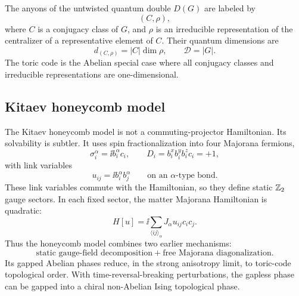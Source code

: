 The anyons of the untwisted quantum double \(D(G)\) are labeled by
\begin{equation}
\label{eq:conclusion-quantum-double-labels}
    (C,\rho),
\end{equation}
where \(C\) is a conjugacy class of \(G\), and \(\rho\) is an irreducible representation of the centralizer of a representative element of \(C\).  Their quantum dimensions are
\begin{equation}
\label{eq:conclusion-qdouble-dimensions}
    d_{(C,\rho)}=|C|\dim\rho,
    \qquad
    \mathcal{D}=|G|.
\end{equation}
The toric code is the Abelian special case where all conjugacy classes and irreducible representations are one-dimensional.

\subsection{Kitaev honeycomb model}

The Kitaev honeycomb model is not a commuting-projector Hamiltonian.  Its solvability is subtler.  It uses spin fractionalization into four Majorana fermions,
\begin{equation}
\label{eq:conclusion-khc-majorana-representation}
    \sigma_i^\alpha=\ii b_i^\alpha c_i,
    \qquad
    D_i=b_i^x b_i^y b_i^z c_i=+1,
\end{equation}
with link variables
\begin{equation}
\label{eq:conclusion-khc-link-variable}
    u_{ij}=\ii b_i^\alpha b_j^\alpha
    \qquad
    \text{on an }\alpha\text{-type bond}.
\end{equation}
These link variables commute with the Hamiltonian, so they define static \(\mathbb{Z}_2\) gauge sectors.  In each fixed sector, the matter Majorana Hamiltonian is quadratic:
\begin{equation}
\label{eq:conclusion-khc-free-majorana}
    H[u]
    =
    \ii\sum_{\langle ij\rangle_\alpha}
    J_\alpha u_{ij}c_i c_j .
\end{equation}
Thus the honeycomb model combines two earlier mechanisms:
\begin{equation}
\label{eq:conclusion-khc-two-mechanisms}
    \text{static gauge-field decomposition}
    +
    \text{free Majorana diagonalization}.
\end{equation}
Its gapped Abelian phases reduce, in the strong anisotropy limit, to toric-code topological order.  With time-reversal-breaking perturbations, the gapless phase can be gapped into a chiral non-Abelian Ising topological phase.

